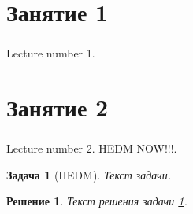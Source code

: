 \documentclass[t]{beamer}  %
\newtheorem{rproblem}{Задача}
\newtheorem{rsolve}{Решение}
\begin{document}

	\section{Занятие 1}
	\begin{frame}
		\frametitle{\insertsection}
		Lecture number 1.	
	\end{frame}
	
	\section{Занятие 2}
	\begin{frame}
		\frametitle{\insertsection}
		Lecture number 2.	
		HEDM NOW!!!.
	\end{frame}

\begin{frame}
	\begin{rproblem}[HEDM]\label{HEDM}
		Текст задачи.
	\end{rproblem}
	\begin{rsolve}
		Текст решения задачи \ref{HEDM}.
	\end{rsolve}
\end{frame}
\end{document}
